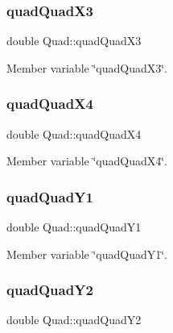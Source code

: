 \subsubsection{\texorpdfstring{quad\+Quad\+X3}{quadQuadX3}}
{\footnotesize\ttfamily double Quad\+::quad\+Quad\+X3\hspace{0.3cm}{\ttfamily [private]}}



Member variable \char`\"{}quad\+Quad\+X3\char`\"{}. 

\mbox{\label{classQuad_a6bc4285074ff7259ab59293fe207af01}} 
\subsubsection{\texorpdfstring{quad\+Quad\+X4}{quadQuadX4}}
{\footnotesize\ttfamily double Quad\+::quad\+Quad\+X4\hspace{0.3cm}{\ttfamily [private]}}



Member variable \char`\"{}quad\+Quad\+X4\char`\"{}. 

\mbox{\label{classQuad_aa15251ffcca05eb0e35a3d6b60782c9d}} 
\subsubsection{\texorpdfstring{quad\+Quad\+Y1}{quadQuadY1}}
{\footnotesize\ttfamily double Quad\+::quad\+Quad\+Y1\hspace{0.3cm}{\ttfamily [private]}}



Member variable \char`\"{}quad\+Quad\+Y1\char`\"{}. 

\mbox{\label{classQuad_afa2e09e70744ac127feedd54d2c2de85}} 
\subsubsection{\texorpdfstring{quad\+Quad\+Y2}{quadQuadY2}}
{\footnotesize\ttfamily double Quad\+::quad\+Quad\+Y2\hspace{0.3cm}{\ttfamily [private]}}



